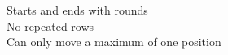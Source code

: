 \documentclass[preview]{standalone}
\begin{document}
Starts and ends with rounds\\No repeated rows\\Can only move a maximum of one position\\
\end{document}
